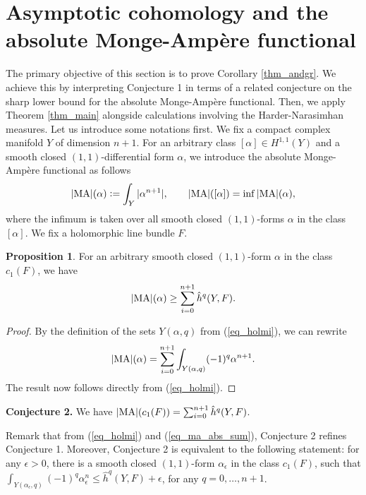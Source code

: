 \documentclass[12pt]{article}
\numberwithin{equation}{section}
\theoremstyle{theorem}
\theoremstyle{definition}
\newtheorem{prop}[thm]{Proposition}
\theoremstyle{remark}
\begin{document}
	
	
	\section{Asymptotic cohomology and the absolute Monge-Ampère functional}\label{sect_dem_conj}
	The primary objective of this section is to prove Corollary \ref{thm_andgr}. 
	We achieve this by interpreting Conjecture 1 in terms of a related conjecture on the sharp lower bound for the absolute Monge-Ampère functional. 
	Then, we apply Theorem \ref{thm_main} alongside calculations involving the Harder-Narasimhan measures.
	Let us introduce some notations first. 
	We fix a compact complex manifold $Y$ of dimension $n + 1$.
	For an arbitrary class $[\alpha] \in H^{1, 1}(Y)$ and a smooth closed $(1, 1)$-differential form $\alpha$, we introduce the absolute Monge-Ampère functional as follows
	\begin{equation}\label{defn_ama_func}
		|{\rm{MA}}|(\alpha) := \int_Y |\alpha^{n + 1}|, \qquad |{\rm{MA}}|([\alpha]) = \inf |{\rm{MA}}|(\alpha),
	\end{equation}
	where the infimum is taken over all smooth closed $(1, 1)$-forms $\alpha$ in the class $[\alpha]$.
	We fix a holomorphic line bundle $F$.
	\begin{prop}\label{prop_ma_low_bnd}
		For an arbitrary smooth closed $(1, 1)$-form $\alpha$ in the class $c_1(F)$, we have
		\begin{equation}\label{eq_ma_abs_sum}
			|{\rm{MA}}|(\alpha) \geq \sum_{i = 0}^{n + 1} \hat{h}^q(Y, F).
		\end{equation}
	\end{prop}
	\begin{proof}
		By the definition of the sets $Y(\alpha, q)$ from (\ref{eq_holmi}), we can rewrite 
		\begin{equation}
			|{\rm{MA}}|(\alpha) = \sum_{i = 0}^{n + 1} \int_{Y(\alpha, q)} (-1)^q \alpha^{n + 1}.
		\end{equation}
		The result now follows directly from (\ref{eq_holmi}).
	\end{proof}
	\par 
	\noindent \textbf{Conjecture 2.} We have 
	$|{\rm{MA}}|(c_1(F)) = \sum_{i = 0}^{n + 1} \hat{h}^q(Y, F)$.
	\vspace*{0.3cm}	
	\par 
	Remark that from (\ref{eq_holmi}) and (\ref{eq_ma_abs_sum}), Conjecture 2 refines Conjecture 1. Moreover, Conjecture 2 is equivalent to the following statement: for any $\epsilon > 0$, there is a smooth closed $(1, 1)$-form $\alpha_{\epsilon}$ in the class $c_1(F)$, such that $\int_{Y(\alpha_{\epsilon}, q)} (-1)^q \alpha_{\epsilon}^n \leq \hat{h}^q(Y, F) + \epsilon$, for any $q = 0, \ldots, n + 1$.
\end{document}

